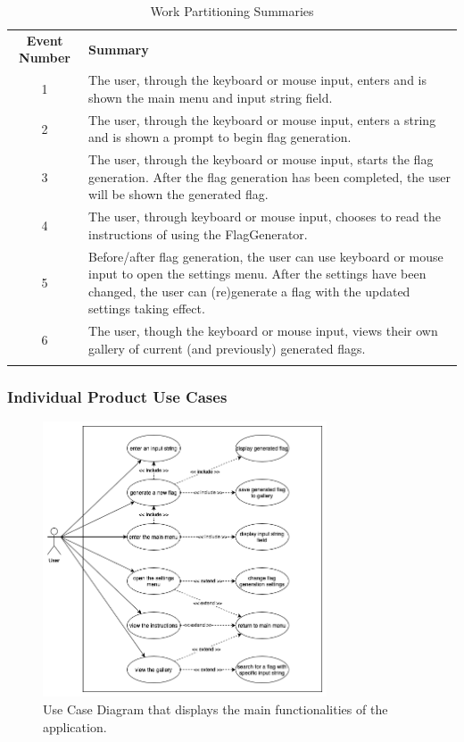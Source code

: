 \documentclass[12pt, titlepage]{article}
\begin{document}
\begin{table}[h!]
    \centering
    \caption{Work Partitioning Summaries}
    \begin{tabularx}{\textwidth}{|c|X|}
        \hhline{|-|-|}
        \textbf{Event Number} & \textbf{Summary} \\
        \hhline{|-|-|}
        1 & The user, through the keyboard or mouse input, enters and is shown the main menu and input string field. \\
        \hhline{|-|-|}
        2 & The user, through the keyboard or mouse input, enters a string and is shown a prompt to begin flag generation. \\
        \hhline{|-|-|}
        3 & The user, through the keyboard or mouse input, starts the flag generation. After the flag generation has been completed, the user will be shown the generated flag. \\
        \hhline{|-|-|}
        4 & The user, through keyboard or mouse input, chooses to read the instructions of using the FlagGenerator. \\
        \hhline{|-|-|}
        5 & Before/after flag generation, the user can use keyboard or mouse input to open the settings menu. After the settings have been changed, the user can (re)generate a flag with the updated settings taking effect. \\
        \hhline{|-|-|}
        6 & The user, though the keyboard or mouse input, views their own gallery of current (and previously) generated flags. \\
        \hhline{|-|-|}
    \end{tabularx}
\end{table}

\pagebreak

\subsubsection{Individual Product Use Cases}

\begin{figure}[h!]
    \centering
    \includegraphics[width=0.75\textwidth]{FRs_UseCaseDiagram.png}
    \caption{Use Case Diagram that displays the main functionalities of the application.}
    \label{fig:FRs_UCD}
\end{figure}
\end{document}
